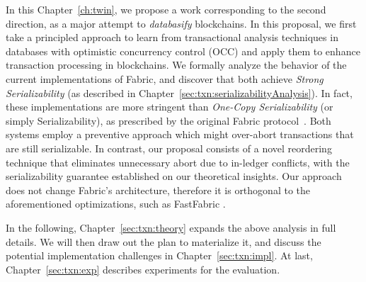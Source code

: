In this Chapter~\ref{ch:twin}, we propose a work corresponding to the second direction, as a major attempt to
\textit{databasify} blockchains.
%
In this proposal, we first take a principled approach to learn from transactional analysis
techniques in databases with optimistic concurrency control (OCC) and apply them
to enhance transaction processing in blockchains.
%
We formally analyze the behavior of the current implementations of Fabric, and discover that both
achieve \textit{Strong Serializability} \cite{bailis2013highly} (as described in Chapter~\ref{sec:txn:serializabilityAnalysis}).
%
In fact, these implementations are more stringent than
\textit{One-Copy Serializability} (or simply Serializability), as prescribed by the original Fabric protocol~\cite{androulaki2018hyperledger}.
%
Both systems employ a preventive approach which might over-abort transactions that are still serializable.
%
In contrast, our proposal consists of a novel reordering technique that
eliminates unnecessary abort due to in-ledger conflicts, with the serializability guarantee established on our theoretical insights. 
%
Our approach does not change Fabric's architecture, therefore it is orthogonal to the aforementioned optimizations, such as FastFabric \cite{gorenflo2019fastfabric}. 

In the following, Chapter~\ref{sec:txn:theory} expands the above analysis in full details. 
We will then draw out the plan to materialize it, and discuss the potential implementation challenges in Chapter~\ref{sec:txn:impl}.
At last, Chapter~\ref{sec:txn:exp} describes experiments for the evaluation.

  
  

